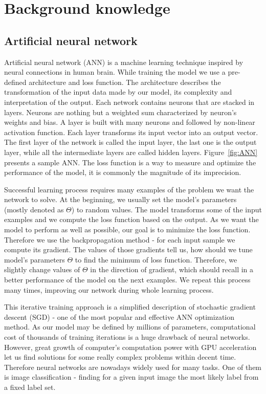 \documentclass{article}
\begin{document}
\section{Background knowledge}
\subsection{Artificial neural network}

Artificial neural network (ANN) is a machine learning technique inspired by neural connections in human brain. While training the model we use a pre-defined architecture and loss function. The architecture describes the transformation of the input data made by our model, its complexity and interpretation of the output. Each network contains neurons that are stacked in layers. Neurons are nothing but a weighted sum characterized by neuron's weights and bias. A layer is built with many neurons and followed by non-linear activation function. Each layer transforms its input vector into an output vector. The first layer of the network is called the input layer, the last one is the output layer, while all the intermediate layers are called hidden layers. Figure~\ref{fig:ANN} presents a sample ANN. The loss function is a way to measure and optimize the performance of the model, it is commonly the magnitude of its imprecision. 
\par
Successful learning process requires many examples of the problem we want the network to solve. At the beginning, we usually set the model's parameters (mostly denoted as $\Theta$) to random values. The model transforms some of the input examples and we compute the loss function based on the output. As we want the model to perform as well as possible, our goal is to minimize the loss function. Therefore we use the backpropagation method - for each input sample we compute its gradient. The values of those gradients tell us, how should we tune model's parameters $\Theta$ to find the minimum of loss function. Therefore, we slightly change values of $\Theta$ in the direction of gradient, which should recall in a better performance of the model on the next examples. We repeat this process many times, improving our network during whole learning process. 
\par
This iterative training approach is a simplified description of stochastic gradient descent (SGD) - one of the most popular and effective ANN optimization method. As our model may be defined by millions of parameters, computational cost of thousands of training iterations is a huge drawback of neural networks. However, great growth of computer's computation power with GPU acceleration let us find solutions for some really complex problems within decent time.  Therefore neural networks are nowadays widely used for many tasks. One of them is image classification - finding for a given input image the most likely label from a fixed label set.
\end{document}
